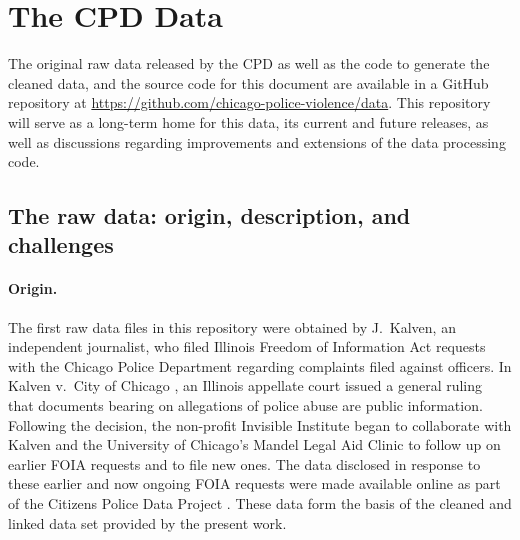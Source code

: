 \section{The CPD Data} \label{sec:data}

The original raw data released by the CPD as well as the code to generate the
cleaned data, and the source code for this document are available in a GitHub
repository at \url{https://github.com/chicago-police-violence/data}. This
repository will serve as a long-term home for this data, its current and future
releases, as well as discussions regarding improvements and extensions of the
data processing code.



\subsection{The raw data: origin, description, and challenges}

\paragraph{Origin.}
The first raw data files in this repository were obtained by J.~Kalven, an 
independent journalist, who filed Illinois Freedom of Information Act requests with 
the Chicago Police Department regarding complaints filed against officers. 
In Kalven v.~City of Chicago \cite{kalven2014}, an Illinois appellate court issued
a general ruling that documents bearing on allegations of
police abuse are public information. Following 
the decision, the non-profit
Invisible Institute began to collaborate with Kalven 
and the University of Chicago's Mandel Legal Aid
Clinic to follow up on earlier FOIA requests and to file new ones. The data
disclosed in response to these earlier and now ongoing FOIA requests were made available
online as part of the Citizens Police Data Project \cite{cpdp}.
These data form the basis of the cleaned and linked data set provided by the present work.

